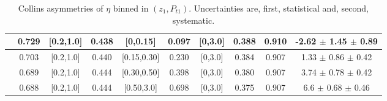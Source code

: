 \begin{table}[H]
\begin{tabular}{|c| c| c| c| c| c| c| c| c| c|}
\hline
[0.7,1.0]	&	0.729	&	[0.2,1.0]	&	0.438	&	[0,0.15]	&	0.097	&	[0,3.0]	&	0.388	&	0.910	&  -2.62  $\pm$ 1.45  $\pm$ 0.89    \\ \hline
[0.7,1.0]	&	0.703	&	[0.2,1.0]	&	0.440	&	[0.15,0.30]	&	0.230	&	[0,3.0]	&	0.384	&	0.907	&  1.33  $\pm$ 0.86  $\pm$ 0.42     \\ \hline
[0.7,1.0]	&	0.689	&	[0.2,1.0]	&	0.444	&	[0.30,0.50]	&	0.398	&	[0,3.0]	&	0.380	&	0.907	&  3.74  $\pm$ 0.78  $\pm$ 0.42     \\ \hline
[0.7,1.0]	&	0.688	&	[0.2,1.0]	&	0.444	&	[0.50,3.0]	&	0.698	&	[0,3.0]	&	0.375	&	0.907	&  6.6  $\pm$ 0.68  $\pm$ 0.46    	\\ \hline
\end{tabular}
\caption[Collins asymmetries of $\eta$ binned in $(z_{1},P_{t1})$]{Collins asymmetries of $\eta$ binned in $(z_{1},P_{t1})$. Uncertainties are, first, statistical and, second, systematic.}
\label{tab:finaletaptbins}
\end{table}

